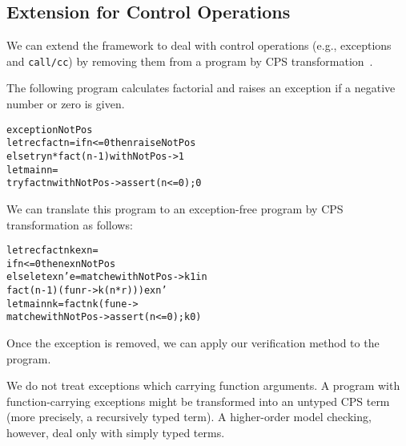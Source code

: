 \vspace{-2pt}
\subsection{Extension for Control Operations}
\label{sec:control} We can extend the framework to deal with control
operations (e.g., exceptions and \texttt{call/cc}) by removing them
from a program by CPS transformation~\cite{Nielsen2001}.

The following program calculates factorial and raises an exception if
a negative number or zero is given.
\vspace{-5pt}
\begin{alltt}
 exception NotPos
 letrec fact n = if n <= 0 then raise NotPos
   else try n * fact (n - 1) with NotPos -> 1
 let main n =
   try fact n with NotPos -> assert (n <= 0); 0
\end{alltt}
\vspace{-5pt}
We can translate this program to an exception-free program by CPS transformation as follows:
\vspace{-5pt}
\begin{alltt}
 letrec fact n k exn =
   if n <= 0 then exn NotPos
   else let exn' e = match e with NotPos -> k 1 in
          fact (n - 1) (fun r -> k (n * r))) exn'
 let main n k = fact n k (fun e ->
   match e with NotPos -> assert (n <= 0); k 0)
\end{alltt}
\vspace{-5pt}
Once the exception is removed, we can apply our verification method to the
program.

We do not treat exceptions which carrying function arguments.
A program with function-carrying exceptions might be transformed into an
untyped CPS term (more precisely, a recursively typed term).  A
higher-order model checking, however, deal only with simply typed terms.

